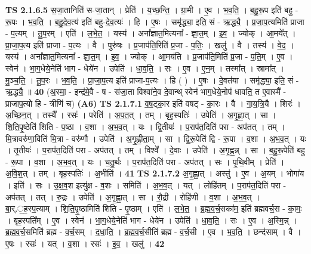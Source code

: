 \documentclass[17pt]{extarticle}
\begin{document}
                  \newline
                                \textbf{ TS 2.1.6.5} \newline
                  स॒जा॒तानिति॑ स-जा॒तान् । प्रेति॑ । य॒च्छ॒न्ति॒ । ग्रा॒मी । ए॒व । भ॒व॒ति॒ । ब॒हु॒रू॒प इति॑ बहु - रू॒पः । भ॒व॒ति॒ । ब॒हु॒दे॒व॒त्य॑ इति॑ बहु-दे॒व॒त्यः॑ । हि । ए॒षः । समृ॑द्ध्या॒ इति॒ सं - ऋ॒द्ध्यै॒ । प्र॒जा॒प॒त्यमिति॑ प्राजा - प॒त्यम् । तू॒प॒रम् । एति॑ । ल॒भे॒त॒ । यस्य॑ । अना᳚ज्ञात॒मित्यना᳚ - ज्ञा॒त॒म् । इ॒व॒ । ज्योक् । आ॒मये᳚त् । प्रा॒जा॒प॒त्य इति॑ प्राजा - प॒त्यः । वै । पुरु॑षः । प्र॒जाप॑ति॒रिति॑ प्र॒जा - प॒तिः॒ । खलु॑ । वै । तस्य॑ । वे॒द॒ । यस्य॑ । अना᳚ज्ञात॒मित्यना᳚ - ज्ञा॒त॒म् । इ॒व॒ । ज्योक् । आ॒मय॑ति । प्र॒जाप॑ति॒मिति॑ प्र॒जा - प॒ति॒म् । ए॒व । स्वेन॑ । भा॒ग॒धेये॒नेति॑ भाग - धेये॑न । उपेति॑ । धा॒व॒ति॒ । सः । ए॒व । ए॒न॒म् । तस्मा᳚त् । स्रामा᳚त् । मु॒ञ्च॒ति॒ । तू॒प॒रः । भ॒व॒ति॒ । प्रा॒जा॒प॒त्य इति॑ प्राजा-प॒त्यः । हि ( ) । ए॒षः । दे॒वत॑या । समृ॑द्ध्या॒ इति॒ सं - ऋ॒द्ध्यै॒ ॥ \textbf{  40} \newline
                  \newline
                      (अ॒स्मा॒ - इन्द्र॑मे॒वै - ष - स॑जा॒ता विश्वा॑ने॒व दे॒वान्थ् स्वेन॑ भाग॒धेये॒नोप॑ धावति॒ त ए॒वास्मै᳚ - प्राजाप॒त्यो हि - त्रीणि॑ च) \textbf{(A6)} \newline \newline
                                \textbf{ TS 2.1.7.1} \newline
                  व॒ष॒ट्का॒र इति॑ वषट् - का॒रः । वै । गा॒य॒त्रि॒यै । शिरः॑ । अ॒च्छि॒न॒त् । तस्यै᳚ । रसः॑ । परेति॑ । अ॒प॒त॒त् । तम् । बृह॒स्पतिः॑ । उपेति॑ । अ॒गृ॒ह्णा॒त् । सा । शि॒ति॒पृ॒ष्ठेति॑ शिति - प॒ष्ठा । व॒शा । अ॒भ॒व॒त् । यः । द्वि॒तीयः॑ । प॒राप॑त॒दिति॑ परा - अप॑तत् । तम् । मि॒त्रावरु॑णा॒विति॑ मि॒त्रा - वरु॑णौ । उपेति॑ । अ॒गृ॒ह्णी॒ता॒म् । सा । द्वि॒रू॒पेति॑ द्वि - रू॒पा । व॒शा । अ॒भ॒व॒त् । यः । तृ॒तीयः॑ । प॒राप॑त॒दिति॑ परा - अप॑तत् । तम् । विश्वे᳚ । दे॒वाः । उपेति॑ । अ॒गृ॒ह्ण॒न्न् । सा । ब॒हु॒रू॒पेति॑ बहु - रू॒पा । व॒शा । अ॒भ॒व॒त् । यः । च॒तु॒र्थः । प॒राप॑त॒दिति॑ परा - अप॑तत् । सः । पृ॒थि॒वीम् । प्रेति॑ । अ॒वि॒श॒त् । तम् । बृह॒स्पतिः॑ । अ॒भीति॑ । \textbf{  41} \newline
                  \newline
                                \textbf{ TS 2.1.7.2} \newline
                  अ॒गृ॒ह्णा॒त् । अस्तु॑ । ए॒व । अ॒यम् । भोगा॑य । इति॑ । सः । उ॒क्ष॒व॒श इत्यु॑क्ष - व॒शः । समिति॑ । अ॒भ॒व॒त् । यत् । लोहि॑तम् । प॒राप॑त॒दिति॑ परा - अप॑तत् । तत् । रु॒द्रः । उपेति॑ । अ॒गृ॒ह्णा॒त् । सा । रौ॒द्री । रोहि॑णी । व॒शा । अ॒भ॒व॒त् । बा॒र्.॒ह॒स्प॒त्याम् । शि॒ति॒पृ॒ष्ठामिति॑ शिति - पृ॒ष्ठाम् । एति॑ । ल॒भे॒त॒ । ब्र॒ह्म॒व॒र्च॒सका॑म॒ इति॑ ब्रह्मवर्च॒स - का॒मः॒ । बृह॒स्पति᳚म् । ए॒व । स्वेन॑ । भा॒ग॒धेये॒नेति॑ भाग - धेये॑न । उपेति॑ । धा॒व॒ति॒ । सः । ए॒व । अ॒स्मि॒न्न् । ब्र॒ह्म॒व॒र्च॒समिति॑ ब्रह्म - व॒र्च॒सम् । द॒धा॒ति॒ । ब्र॒ह्म॒व॒र्च॒सीति॑ ब्रह्म - व॒र्च॒सी । ए॒व । भ॒व॒ति॒ । छन्द॑साम् । वै । ए॒षः । रसः॑ । यत् । व॒शा । रसः॑ । इ॒व॒ । खलु॑ । \textbf{  42} \newline
\end{document}
